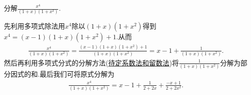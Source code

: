 \documentclass[../../main.tex]{subfiles}%
\begin{document}
\begin{example}
分解$\frac{x^4}{(1+x)(1+x^2)}$.
\end{example}
\begin{solution}

先利用多项式除法用$x^4$除以$(1+x)(1+x^2)$得到$x^4=\left( x-1 \right) \left( 1+x \right) \left( 1+x^2 \right) +1$.从而
\begin{align*}
\frac{x^4}{\left( 1+x \right) \left( 1+x^2 \right)}=\frac{\left( x-1 \right) \left( 1+x \right) \left( 1+x^2 \right) +1}{\left( 1+x \right) \left( 1+x^2 \right)}=x-1+\frac{1}{\left( 1+x \right) \left( 1+x^2 \right)}.
\end{align*}
然后再利用多项式分式的分解方法(\hyperref[将多项式分式分解为其部分因式的和常用方法]{待定系数法和留数法})将$\frac{1}{\left( 1+x \right) \left( 1+x^2 \right)}$分解为部分因式的和.最后我们可将原式分解为
\begin{align*}
\frac{x^4}{\left( 1+x \right) \left( 1+x^2 \right)}=x-1+\frac{1}{2+2x}+\frac{-x+1}{2+2x^2}.
\end{align*}

\end{solution}
\end{document}
